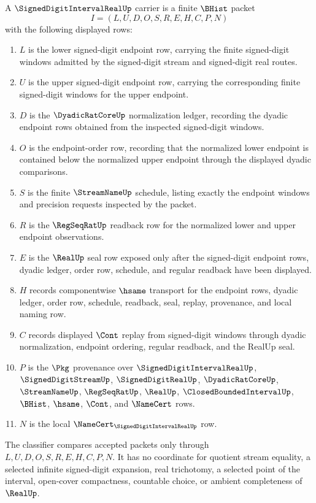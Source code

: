 \begin{definition}
\label{def:signed-digit-interval-real-carrier}
A $\SignedDigitIntervalRealUp$ carrier is a finite $\BHist$ packet
$$
I=(L,U,D,O,S,R,E,H,C,P,N)
$$
with the following displayed rows:
\begin{enumerate}
\item $L$ is the lower signed-digit endpoint row, carrying the finite signed-digit windows admitted by the signed-digit stream and signed-digit real routes.
\item $U$ is the upper signed-digit endpoint row, carrying the corresponding finite signed-digit windows for the upper endpoint.
\item $D$ is the $\DyadicRatCoreUp$ normalization ledger, recording the dyadic endpoint rows obtained from the inspected signed-digit windows.
\item $O$ is the endpoint-order row, recording that the normalized lower endpoint is contained below the normalized upper endpoint through the displayed dyadic comparisons.
\item $S$ is the finite $\StreamNameUp$ schedule, listing exactly the endpoint windows and precision requests inspected by the packet.
\item $R$ is the $\RegSeqRatUp$ readback row for the normalized lower and upper endpoint observations.
\item $E$ is the $\RealUp$ seal row exposed only after the signed-digit endpoint rows, dyadic ledger, order row, schedule, and regular readback have been displayed.
\item $H$ records componentwise $\hsame$ transport for the endpoint rows, dyadic ledger, order row, schedule, readback, seal, replay, provenance, and local naming row.
\item $C$ records displayed $\Cont$ replay from signed-digit windows through dyadic normalization, endpoint ordering, regular readback, and the RealUp seal.
\item $P$ is the $\Pkg$ provenance over $\SignedDigitIntervalRealUp$, $\SignedDigitStreamUp$, $\SignedDigitRealUp$, $\DyadicRatCoreUp$, $\StreamNameUp$, $\RegSeqRatUp$, $\RealUp$, $\ClosedBoundedIntervalUp$, $\BHist$, $\hsame$, $\Cont$, and $\NameCert$ rows.
\item $N$ is the local $\NameCert_{\SignedDigitIntervalRealUp}$ row.
\end{enumerate}
The classifier compares accepted packets only through $L,U,D,O,S,R,E,H,C,P,N$. It has no coordinate for quotient stream equality, a selected infinite signed-digit expansion, real trichotomy, a selected point of the interval, open-cover compactness, countable choice, or ambient completeness of $\RealUp$.
\end{definition}

